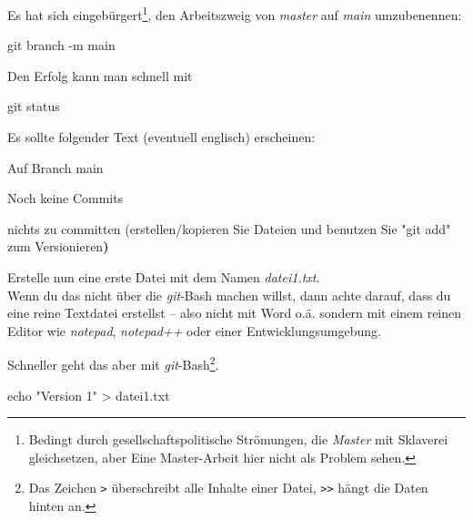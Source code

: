 \documentclass[
  letterpaper,
  DIV=11]{scrreprt}
\newenvironment{Shaded}{\begin{snugshade}}{\end{snugshade}}
\newcommand{\AttributeTok}[1]{\textcolor[rgb]{0.40,0.45,0.13}{#1}}
\newcommand{\BuiltInTok}[1]{\textcolor[rgb]{0.00,0.23,0.31}{#1}}
\newcommand{\ErrorTok}[1]{\textcolor[rgb]{0.68,0.00,0.00}{#1}}
\newcommand{\ExtensionTok}[1]{\textcolor[rgb]{0.00,0.23,0.31}{#1}}
\newcommand{\FunctionTok}[1]{\textcolor[rgb]{0.28,0.35,0.67}{#1}}
\newcommand{\KeywordTok}[1]{\textcolor[rgb]{0.00,0.23,0.31}{\textbf{#1}}}
\newcommand{\NormalTok}[1]{\textcolor[rgb]{0.00,0.23,0.31}{#1}}
\newcommand{\OperatorTok}[1]{\textcolor[rgb]{0.37,0.37,0.37}{#1}}
\newcommand{\StringTok}[1]{\textcolor[rgb]{0.13,0.47,0.30}{#1}}
\newcommand{\git}{\textit{git}\xspace}
\newcommand{\datei}[1]{\textit{#1}\xspace}
\begin{document}
Es hat sich eingebürgert\footnote{Bedingt durch gesellschaftspolitische
  Strömungen, die \emph{Master} mit Sklaverei gleichsetzen, aber Eine
  Master-Arbeit hier nicht als Problem sehen.}, den Arbeitszweig von
\emph{master} auf \emph{main} umzubenennen:

\begin{Shaded}
\begin{Highlighting}[]
\FunctionTok{git}\NormalTok{ branch }\AttributeTok{{-}m}\NormalTok{ main }
\end{Highlighting}
\end{Shaded}

Den Erfolg kann man schnell mit

\begin{Shaded}
\begin{Highlighting}[]
\FunctionTok{git}\NormalTok{ status}
\end{Highlighting}
\end{Shaded}

Es sollte folgender Text (eventuell englisch) erscheinen:

\begin{Shaded}
\begin{Highlighting}[]
\ExtensionTok{Auf}\NormalTok{ Branch main}

\ExtensionTok{Noch}\NormalTok{ keine Commits}

\ExtensionTok{nichts}\NormalTok{ zu committen }\ErrorTok{(}\ExtensionTok{erstellen/kopieren}\NormalTok{ Sie Dateien und benutzen}
\ExtensionTok{Sie} \StringTok{"git add"}\NormalTok{ zum Versionieren}\KeywordTok{)}
\end{Highlighting}
\end{Shaded}

Erstelle nun eine erste Datei mit dem Namen \datei{datei1.txt}.\\
Wenn du das nicht über die \git-Bash machen willst, dann achte darauf,
dass du eine reine Textdatei erstellst -- also nicht mit Word o.ä.
sondern mit einem reinen Editor wie \emph{notepad}, \emph{notepad++}
oder einer Entwicklungsumgebung.

Schneller geht das aber mit \git-Bash\footnote{Das Zeichen
  \texttt{\textgreater{}} überschreibt alle Inhalte einer Datei,
  \texttt{\textgreater{}\textgreater{}} hängt die Daten hinten an.}.

\begin{Shaded}
\begin{Highlighting}[]
\BuiltInTok{echo} \StringTok{"Version 1"} \OperatorTok{\textgreater{}}\NormalTok{ datei1.txt }
\end{Highlighting}
\end{Shaded}
\end{document}

